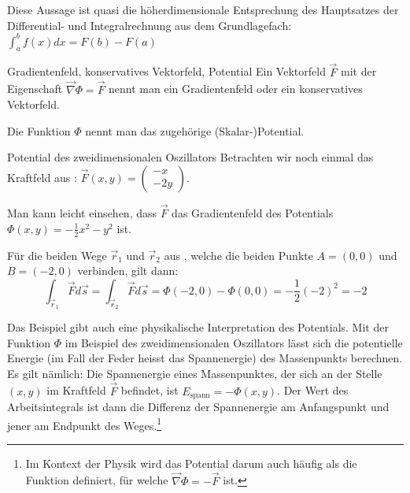 Diese Aussage ist quasi die höherdimensionale Entsprechung des Hauptsatzes der Differential- und Integralrechnung aus dem Grundlagefach: \(\int_{a}^{b} f(x) dx = F(b) - F(a)\)


\begin{definition}
    {Gradientenfeld, konservatives Vektorfeld, Potential}{}
    Ein Vektorfeld \(\vec{F}\) mit der Eigenschaft \(\vec{\nabla} \Phi = \vec{F}\) nennt man ein Gradientenfeld oder ein konservatives Vektorfeld.

    Die Funktion \(\Phi\) nennt man das zugehörige (Skalar-)Potential.
\end{definition}
\begin{bsp}
    {Potential des zweidimensionalen Oszillators}{
    }
    Betrachten wir noch einmal das Kraftfeld aus : \(\vec{F}(x,y)=\begin{pmatrix}
        -x \\ -2y
    \end{pmatrix}\).

    Man kann leicht einsehen, dass \(\vec{F}\) das Gradientenfeld des Potentials \(\Phi(x,y) = -\frac{1}{2} x^2 - y^2\) ist.

    Für die beiden Wege \(\vec{r}_1\) und \(\vec{r}_2\) aus , welche die beiden Punkte \(A=(0,0)\) und \(B=(-2,0)\) verbinden, gilt dann:
    \[\int_{\vec{r}_1} \vec{F} d\vec{s} =\int_{\vec{r}_2} \vec{F} d\vec{s} = \Phi(-2,0) - \Phi(0,0) = -\frac{1}{2} (-2)^2 = -2\]

\end{bsp}

Das Beispiel gibt auch eine physikalische Interpretation des Potentials. Mit der Funktion \(\Phi\) im Beispiel des zweidimensionalen Oszillators lässt sich die potentielle Energie (im Fall der Feder heisst das Spannenergie) des Massenpunkts berechnen. Es gilt nämlich: Die Spannenergie eines Massenpunktes, der sich an der Stelle \((x,y)\) im Kraftfeld \(\vec{F}\) befindet, ist \(E_{\text{spann}} = - \Phi(x,y)\). Der Wert des Arbeitsintegrals ist dann die Differenz der Spannenergie am Anfangspunkt und jener am Endpunkt des Weges.\footnote{Im Kontext der Physik wird das Potential darum auch häufig als die Funktion definiert, für welche \(\vec{\nabla} \Phi = - \vec{F}\) ist.}


